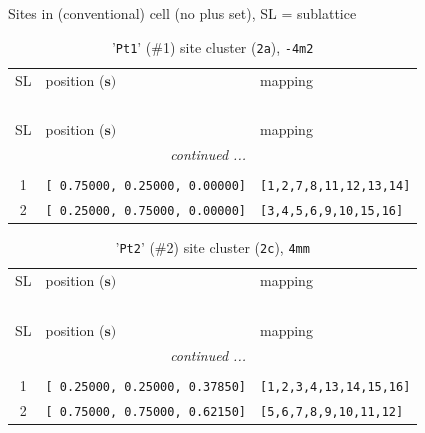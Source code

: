 \documentclass[fleqn,10pt,landscape]{jsarticle}
\begin{document}
\noindent Sites in (conventional) cell (no plus set), SL = sublattice

\renewcommand{\arraystretch}{1.6}
\begin{longtable}[l]{cll}
\captionsetup{justification=raggedright, singlelinecheck=off}
\caption{'\texttt{Pt1}' (\#1) site cluster (\texttt{2a}), \texttt{-4m2}}
 \\
 \hline \hline
SL & position ($\bm{s})$ & mapping \\ \hline \endfirsthead

\multicolumn{2}{l}{\tablename\ \thetable{}} \\
 \hline \hline
SL & position ($\bm{s})$ & mapping \\ \hline \endhead

 \hline \hline
\multicolumn{2}{r}{\footnotesize\it continued ...} \\ \endfoot

 \hline \hline
\multicolumn{2}{r}{} \\ \endlastfoot

1 & \texttt{[ 0.75000, 0.25000, 0.00000]} & \texttt{[1,2,7,8,11,12,13,14]} \\ \hline
2 & \texttt{[ 0.25000, 0.75000, 0.00000]} & \texttt{[3,4,5,6,9,10,15,16]} \\
\end{longtable}
\renewcommand{\arraystretch}{1.6}
\begin{longtable}[l]{cll}
\captionsetup{justification=raggedright, singlelinecheck=off}
\caption{'\texttt{Pt2}' (\#2) site cluster (\texttt{2c}), \texttt{4mm}}
 \\
 \hline \hline
SL & position ($\bm{s})$ & mapping \\ \hline \endfirsthead

\multicolumn{2}{l}{\tablename\ \thetable{}} \\
 \hline \hline
SL & position ($\bm{s})$ & mapping \\ \hline \endhead

 \hline \hline
\multicolumn{2}{r}{\footnotesize\it continued ...} \\ \endfoot

 \hline \hline
\multicolumn{2}{r}{} \\ \endlastfoot

1 & \texttt{[ 0.25000, 0.25000, 0.37850]} & \texttt{[1,2,3,4,13,14,15,16]} \\ \hline
2 & \texttt{[ 0.75000, 0.75000, 0.62150]} & \texttt{[5,6,7,8,9,10,11,12]} \\
\end{longtable}
\end{document}
